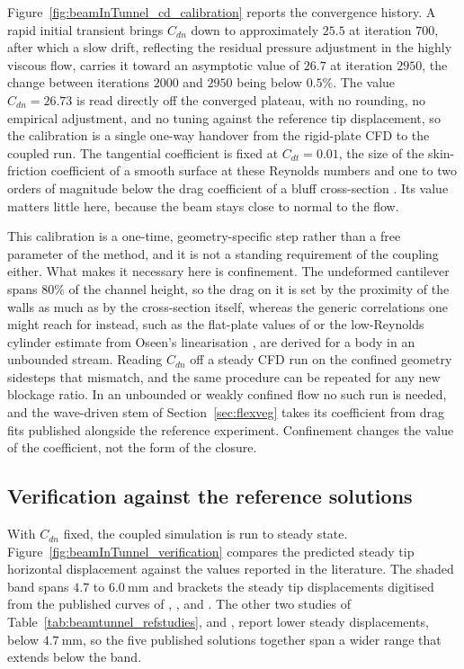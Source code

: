 \noindent
Figure~\ref{fig:beamInTunnel_cd_calibration} reports the convergence history. A rapid initial transient brings $C_{dn}$ down to approximately $25.5$ at iteration $700$, after which a slow drift, reflecting the residual pressure adjustment in the highly viscous flow, carries it toward an asymptotic value of $26.7$ at iteration $2950$, the change between iterations $2000$ and $2950$ being below $0.5\%$. The value $C_{dn} = 26.73$ is read directly off the converged plateau, with no rounding, no empirical adjustment, and no tuning against the reference tip displacement, so the calibration is a single one-way handover from the rigid-plate CFD to the coupled run. The tangential coefficient is fixed at $C_{dt} = 0.01$, the size of the skin-friction coefficient of a smooth surface at these Reynolds numbers and one to two orders of magnitude below the drag coefficient of a bluff cross-section \citep{hoerner_fluid_1965}. Its value matters little here, because the beam stays close to normal to the flow.

\noindent
This calibration is a one-time, geometry-specific step rather than a free parameter of the method, and it is not a standing requirement of the coupling either. What makes it necessary here is confinement. The undeformed cantilever spans $80\%$ of the channel height, so the drag on it is set by the proximity of the walls as much as by the cross-section itself, whereas the generic correlations one might reach for instead, such as the flat-plate values of \citet{hoerner_fluid_1965} or the low-Reynolds cylinder estimate from Oseen's linearisation \citep{lamb_hydrodynamics_1932}, are derived for a body in an unbounded stream. Reading $C_{dn}$ off a steady CFD run on the confined geometry sidesteps that mismatch, and the same procedure can be repeated for any new blockage ratio. In an unbounded or weakly confined flow no such run is needed, and the wave-driven stem of Section~\ref{sec:flexveg} takes its coefficient from drag fits published alongside the reference experiment. Confinement changes the value of the coefficient, not the form of the closure.

\subsection{Verification against the reference solutions}
\label{sec:beamtunnel_verification}

\noindent
With $C_{dn}$ fixed, the coupled simulation is run to steady state. Figure~\ref{fig:beamInTunnel_verification} compares the predicted steady tip horizontal displacement against the values reported in the literature. The shaded band spans $4.7$ to $6.0~\mathrm{mm}$ and brackets the steady tip displacements digitised from the published curves of \citet{zhang_immersed_2012}, \citet{long_coupling_esfem_sph_2021}, and \citet{yan_explicit_velocity_iblbm_2023}. The other two studies of Table~\ref{tab:beamtunnel_refstudies}, \citet{yang_peridynamics_iblbm_2022} and \citet{wang_immersed_esfem_2022}, report lower steady displacements, below $4.7~\mathrm{mm}$, so the five published solutions together span a wider range that extends below the band.


